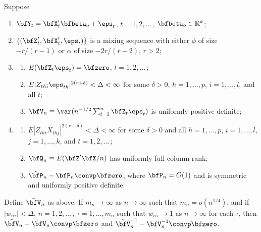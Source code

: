 \begin{theorem}\label{thm:6.21}
Suppose
\begin{enumerate}[label=(\roman*)]
  \item $\bfY_t = \bfX_t'\bfbeta_o + \eps_t$, \quad $t = 1,2,\ldots$\,, \quad $\bfbeta_o \in \mathbb{R}^k$;
  \item $\{(\bfZ_t',\bfX_t',\eps_t)\}$ is a mixing sequence with either $\phi$ of size $-r/(r-1)$ or $\alpha$ of size $-2r/(r-2)$, $r > 2$;
  \item\begin{enumerate}[label=(\alph*)]
    \item $E(\bfZ_t\eps_t) = \bfzero$, \quad $t = 1,2,\ldots$\,;
    \item $E|Z_{thi}\eps_{th}|^{2(r+\delta)} < \Delta < \infty$ for some $\delta > 0$, $h = 1,\ldots,p$, $i = 1,\ldots,l$, and all $t$;
    \item $\bfV_n \equiv \var(n^{-1/2}\sum_{t=1}^{n}\bfZ_t\eps_t)$ is uniformly positive definite;
  \end{enumerate}
  \item\begin{enumerate}[label=(\alph*)]
    \item $E|Z_{thi}X_{thj}|^{2(r+\delta)} < \Delta < \infty$ for some $\delta > 0$ and all $h = 1,\ldots,p$, $i = 1,\ldots,l$, $j = 1,\ldots,k$, and $t = 1,2,\ldots$\,;
    \item $\bfQ_n \equiv E(\bfZ'\bfX/n)$ has uniformly full column rank;
    \item $\hat{\bfP}_n - \bfP_n \convp \bfzero$, where $\bfP_n = O(1)$ and is symmetric and uniformly positive definite.
  \end{enumerate}
\end{enumerate}
Define $\tilde{\bfV}_n$ as above. If $m_n \to \infty$ as $n \to \infty$ such that $m_n = o(n^{1/4})$, and if $|w_{n\tau}| < \Delta$, $n = 1,2,\ldots$\,, $\tau = 1,\ldots,m_n$ such that $w_{n\tau} \to 1$ as $n \to \infty$ for each $\tau$, then $\tilde{\bfV}_n - \bfV_n \convp \bfzero$ and $\tilde{\bfV}_n^{-1} - \bfV_n^{-1} \convp \bfzero$.
\end{theorem}

